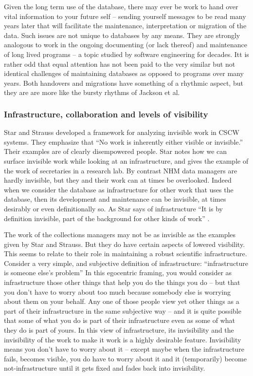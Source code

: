 Given the long term use of the database, there may ever be work to hand over vital information to your future self – sending yourself messages to be read many years later that will facilitate the maintenance, interpretation or migration of the data. Such issues are not unique to databases by any means. They are strongly analogous to work in the ongoing documenting (or lack thereof) and maintenance of long lived programs – a topic studied by software engineering for decades. Itt is rather odd that equal attention has not been paid to the very similar but not identical challenges of maintaining databases as opposed to programs over many years. Both handovers and migrations have something of a rhythmic aspect, but they are are more like the bursty rhythms of Jackson et al. \cite{jackson2011collaborative}

\subsubsection{Infrastructure, collaboration and levels of visibility}

Star and Strauss \cite{star1999layers} developed a framework for analyzing invisible work in CSCW systems. They emphasize that “No work is inherently either visible or invisible.” Their examples are of clearly disempowered people. Star \cite{star1999ethnography} notes how we can surface invisible work while looking at an infrastructure, and gives the example of the work of secretaries in a research lab. By contrast NHM data managers are hardly invisible, but they and their work can at times be overlooked. Indeed when we consider the database as infrastructure for other work that uses the database, then its development and maintenance can be invisible, at times desirably or even definitionally so. As Star says of infrastructure “It is by definition invisible, part of the background for other kinds of work” \cite{star1999ethnography}.

The work of the collections managers may not be as invisible as the examples given by Star and Strauss. But they do have certain aspects of lowered visibility. This seems to relate to their role in maintaining a robust scientific infrastructure. Consider a very simple, and subjective definition of infrastructure: “infrastructure is someone else’s problem” In this egocentric framing, you would consider as infrastructure those other things that help you do the things you do – but that you don’t have to worry about too much because somebody else is worrying about them on your behalf. Any one of those people view yet other things as a part of their infrastructure in the same subjective way – and it is quite possible that some of what you do is part of their infrastructure even as some of what they do is part of yours. In this view of infrastructure, its invisibility and the invisibility of the work to make it work is a highly desirable feature. Invisibility means you don’t have to worry about it – except maybe when the infrastructure fails, becomes visible, you do have to worry about it and it (temporarily) become not-infrastructure until it gets fixed and fades back into invisibility.

